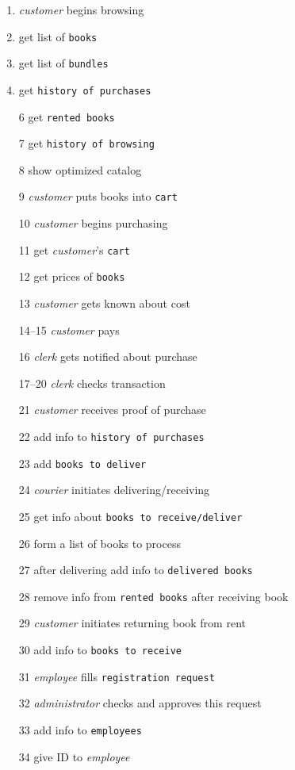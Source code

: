 \documentclass[a4paper,10pt,notitlepage,headsepline,pdftex,twocolumn]{scrartcl}
\begin{document}
\thispagestyle{empty}
\begin{enumerate}
  \item \emph{customer} begins browsing
  \item get list of \texttt{books}
  \item get list of \texttt{bundles}
  \item get \texttt{history of purchases}
  \item[6] get \texttt{rented books}
  \item[7] get \texttt{history of browsing}
  \item[8] show optimized catalog
  \item[9] \emph{customer} puts books into \texttt{cart}
  \item[10] \emph{customer} begins purchasing
  \item[11] get \emph{customer}'s \texttt{cart}
  \item[12] get prices of \texttt{books}
  \item[13] \emph{customer} gets known about cost
  \item[14--15] \emph{customer} pays
  \item[16] \emph{clerk} gets notified about purchase
  \item[17--20] \emph{clerk} checks transaction
  \item[21] \emph{customer} receives proof of purchase
  \item[22] add info to \texttt{history of purchases}
  \item[23] add \texttt{books to deliver}
  \item[24] \emph{courier} initiates delivering/receiving
  \item[25] get info about \texttt{books to receive/deliver}
  \item[26] form a list of books to process
  \item[27] after delivering add info to \texttt{delivered books}
  \item[28] remove info from \texttt{rented books} after receiving book
  \item[29] \emph{customer} initiates returning book from rent
  \item[30] add info to \texttt{books to receive}
  \item[31] \emph{employee} fills \texttt{registration request}
  \item[32] \emph{administrator} checks and approves this request
  \item[33] add info to \texttt{employees}
  \item[34] give ID to \emph{employee}

\end{enumerate}
\end{document}
